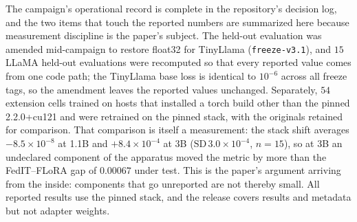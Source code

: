 The campaign's operational record is complete in the repository's decision log, and the two
items that touch the reported numbers are summarized here because measurement discipline is
the paper's subject. The held-out evaluation was amended mid-campaign to restore float32 for
TinyLlama (\texttt{freeze-v3.1}), and $15$ LLaMA held-out evaluations were recomputed so
that every reported value comes from one code path; the TinyLlama base loss is identical to
$10^{-6}$ across all freeze tags, so the amendment leaves the reported values unchanged.
Separately, $54$ extension cells trained on hosts that installed a torch build other than
the pinned 2.2.0+cu121 and were retrained on the pinned stack, with the originals retained
for comparison. That comparison is itself a measurement: the stack shift averages
$-8.5{\times}10^{-8}$ at 1.1B and $+8.4{\times}10^{-4}$ at 3B
($\mathrm{SD}\,3.0{\times}10^{-4}$, $n{=}15$), so at 3B an undeclared component of the
apparatus moved the metric by more than the FedIT--FLoRA gap of $0.00067$ under test. This
is the paper's argument arriving from the inside: components that go unreported are not
thereby small. All reported results use the pinned stack, and the release covers results and
metadata but not adapter weights.
